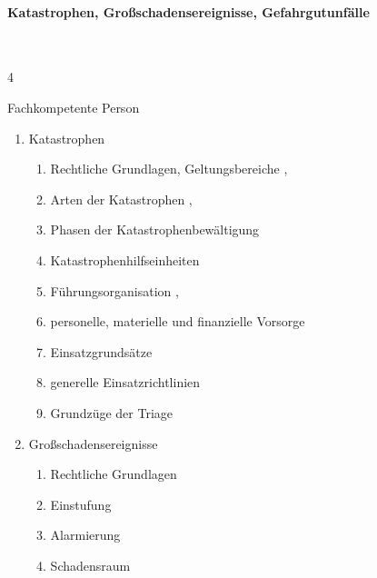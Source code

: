 \paragraph{Katastrophen, Großschadensereignisse, Gefahrgutunfälle} ~
  
  \begin{inparadesc}
    \item[Stundenanzahl:]  4
    \item[Lehrkraft:]  Fachkompetente Person
  \end{inparadesc}
  
  \begin{enumerate}\item
    
    Katastrophen
    \begin{enumerate}
      \item
      Rechtliche Grundlagen,  Geltungsbereiche \dotfill {},
      \item      Arten der Katastrophen \dotfill {},
      \item      Phasen der Katastrophenbewältigung \dotfill  {}
      \item      Katastrophenhilfseinheiten \dotfill {}
      \item      Führungsorganisation \dotfill {},
      \item      personelle, materielle und finanzielle Vorsorge \dotfill {}
      \item      Einsatzgrundsätze \dotfill {}
      \item      generelle Einsatzrichtlinien \dotfill {}
      \item      Grundzüge der Triage \dotfill {}
    \end{enumerate}
    \item
    Großschadensereignisse
    \begin{enumerate}
      \item      Rechtliche Grundlagen \dotfill {}
      \item      Einstufung \dotfill {}
      \item      Alarmierung \dotfill {}
      \item      Schadensraum \dotfill {}

\end{enumerate}
\end{enumerate}
